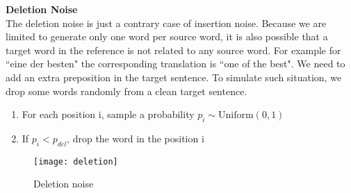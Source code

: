 	




	\textbf{Deletion Noise}\\
	The deletion noise is just a contrary case of insertion noise.
	Because we are limited to generate only one word per source word, it is also possible that a target word in the reference is not related to any source word.  For example for ``eine der besten" the corresponding translation is ``one of the best". We need to add an extra preposition in the target sentence.  To simulate such situation, we drop some words randomly from a clean target sentence.
	
	\begin{enumerate}
		\item For each position i, sample a probability ${p_i \sim \textrm{Uniform}(0,1)}$
		\item If ${p_i} < p_{del}$, drop the word in the position i
	\end{enumerate}
	
		\begin{figure}[h]
		\texttt{[image: deletion]}
		\caption{ Deletion noise}
		\centering
	\end{figure}

	
	
	
	
	
	
	
	
	
	
	
	
	
	
	
	
	
	
	
	
	
	
	
	
	
	
	
	